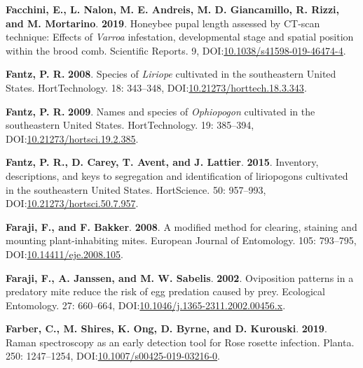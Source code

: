 \documentclass[12pt,final,CPage]{ufthesis}
\newlength{\cslhangindent}
\newenvironment{CSLReferences}[2] %
{%
	\setlength{\parindent}{0pt}
	\ifodd #1 \everypar{\setlength{\hangindent}{\cslhangindent}}\ignorespaces\fi
	\ifnum #2 > 0
	\setlength{\parskip}{#2\baselineskip}
	\fi
}%
{}
\begin{document}
{\begin{CSLReferences}{1}{0}
  \leavevmode{}%
  \textbf{Facchini, E., L. Nalon, M. E. Andreis, M. D. Giancamillo, R. Rizzi, and M. Mortarino}. \textbf{2019}. Honeybee pupal length assessed by {CT}-scan technique: Effects of {\emph{Varroa}} infestation, developmental stage and spatial position within the brood comb. Scientific Reports. 9, DOI:\href{https://doi.org/10.1038/s41598-019-46474-4}{10.1038/s41598-019-46474-4}.

  \leavevmode{}%
  \textbf{Fantz, P. R.} \textbf{2008}. Species of {\emph{Liriope}} cultivated in the southeastern {United States}. {HortTechnology}. 18: 343--348, DOI:\href{https://doi.org/10.21273/horttech.18.3.343}{10.21273/horttech.18.3.343}.

  \leavevmode{}%
  \textbf{Fantz, P. R.} \textbf{2009}. Names and species of {\emph{Ophiopogon}} cultivated in the southeastern {United States}. {HortTechnology}. 19: 385--394, DOI:\href{https://doi.org/10.21273/hortsci.19.2.385}{10.21273/hortsci.19.2.385}.

  \leavevmode{}%
  \textbf{Fantz, P. R., D. Carey, T. Avent, and J. Lattier}. \textbf{2015}. Inventory, descriptions, and keys to segregation and identification of liriopogons cultivated in the southeastern {United States}. {HortScience}. 50: 957--993, DOI:\href{https://doi.org/10.21273/hortsci.50.7.957}{10.21273/hortsci.50.7.957}.

  \leavevmode{}%
  \textbf{Faraji, F., and F. Bakker}. \textbf{2008}. A modified method for clearing, staining and mounting plant-inhabiting mites. European Journal of Entomology. 105: 793--795, DOI:\href{https://doi.org/10.14411/eje.2008.105}{10.14411/eje.2008.105}.

  \leavevmode{}%
  \textbf{Faraji, F., A. Janssen, and M. W. Sabelis}. \textbf{2002}. Oviposition patterns in a predatory mite reduce the risk of egg predation caused by prey. Ecological Entomology. 27: 660--664, DOI:\href{https://doi.org/10.1046/j.1365-2311.2002.00456.x}{10.1046/j.1365-2311.2002.00456.x}.

  \leavevmode{}%
  \textbf{Farber, C., M. Shires, K. Ong, D. Byrne, and D. Kurouski}. \textbf{2019}. {Raman} spectroscopy as an early detection tool for {Rose rosette} infection. Planta. 250: 1247--1254, DOI:\href{https://doi.org/10.1007/s00425-019-03216-0}{10.1007/s00425-019-03216-0}.


\end{CSLReferences}}
\end{document}
